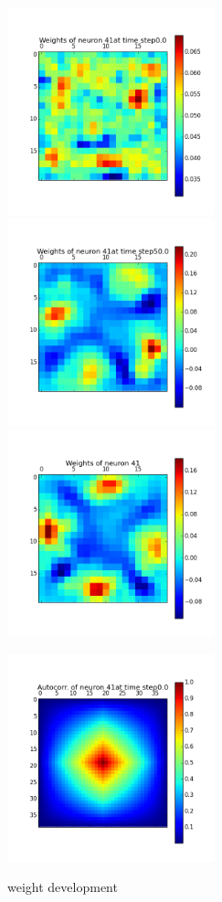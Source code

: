 \documentclass[a4paper, 12pt]{article}
\begin{document}
\begin{figure}[htbp]
\begin{minipage}[hbt]{0,49\textwidth}
        \centering
\includegraphics[width=6cm,height=6cm]{neurons/neuron_w_41_t_0.png}\\[10pt]
\includegraphics[width=6cm,height=6cm]{neurons/neuron_w_41_t_50.png} \\[10pt]
\includegraphics[width=6cm,height=6cm]{neurons/neuron_w_41.png}
        \caption{weight development}
        \label{LabelA}
\end{minipage}
\begin{minipage}[hbt]{0,49\textwidth}
        \centering
\includegraphics[width=6cm,height=6cm]{neurons/neuron_a_41_t_0.png}\\[10pt]

\end{minipage}
\end{figure}
\end{document}
